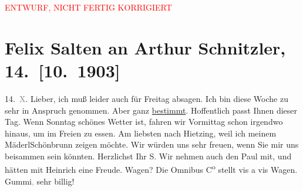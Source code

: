 
\begin{center}
            \textcolor{red}{ENTWURF, NICHT FERTIG KORRIGIERT}
                      \end{center}
            
         
         \renewcommand{\erwaehntePersonen}{Personen: Caroline Kotter, Paul Salten, Heinrich Schnitzler}
         \renewcommand{\erwaehnteOrte}{Orte: Schlosspark Schönbrunn, Wien, XIII., Hietzing}
         \renewcommand{\erwaehnteWerke}{}
               \section[Felix Salten an Arthur Schnitzler, 14. {[}10. 1903{]}]{ Felix Salten an Arthur Schnitzler, 14. {[}10. 1903{]}}\nopagebreak{}\rehead{ }\begin{ledgroupsized}[t]{13cm}\normalsize\beginnumbering \toendnotes[C]{\smallbreak\pagebreak[2]} 
\toendnotes[C]{\smallbreak}\pstart
           \raggedleft{}14. \textcolor{gray}{X}.\pend
           \pstart
           {\pb}Lieber, ich muß leider auch für Freitag absagen. Ich
               bin diese Woche zu sehr in Anspruch genommen. Aber \label{K_L03358-v}\label{K_L03358-h} ganz \uline{bestimmt}. Hoffentlich passt Ihnen dieser Tag. Wenn Sonntag
               schönes Wetter ist, fahren wir Vormittag schon irgendwo hinaus, um im Freien zu
               essen. Am liebsten nach Hietzing, weil ich meinem
                  MäderlSchönbrunn zeigen möchte. Wir würden uns sehr
               freuen, wenn Sie mir uns beisammen sein könnten. \pend
           \pstart Herzlichst Ihr \spacefill\mbox{S.}\pend{}\pstart
           \noindent{}Wir nehmen auch den Paul mit, und hätten mit
                     Heinrich eine Freude. Wagen? Die Omnibus
                     C\textsuperscript{o} stellt vis a vis Wagen.
                     Gummi\textcolor{gray}{,} sehr billig! \pend
           
         
         \endnumbering{}\end{ledgroupsized}\begin{anhang}\end{anhang}\newcommand{\dateiname}{L03358}\newcommand{\titel}{Felix Salten an Arthur Schnitzler, 14. [10. 1903]}\newcommand{\editorInnen}{Martin Anton Müller und Laura Untner}
      